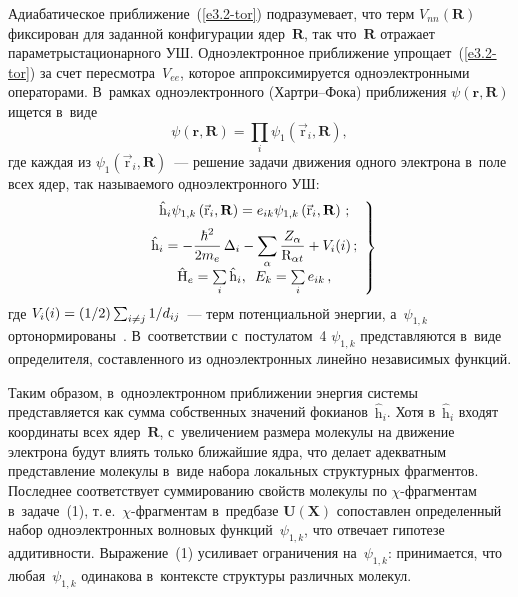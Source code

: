 \begin{multicols}{2}
Адиабатическое приближение~(\ref{e3.2-tor}) подразумевает, что терм 
$V_{nn}(\mathbf{R})$ фиксирован для заданной конфигурации 
ядер~$\mathbf{R}$, так что~$\mathbf{R}$ отражает параметры\linebreak стационарного 
УШ. Одноэлектронное приближение упрощает~(\ref{e3.2-tor}) за счет 
пересмотра~$V_{ee}$, которое аппроксимируется одноэлектронными 
операторами. В~рамках одноэлектронного (\mbox{Харт\-ри--Фо\-ка}) приближения 
$\psi(\mathbf{r},\mathbf{R})$ ищется в~виде 
$$
\psi(\mathbf{r},\mathbf{R})= \prod\limits_i \psi_1\left(\vec{\mathrm{r}}_i, \mathbf{R}\right),
$$
 где каждая из 
$\psi_1(\vec{\mathrm{r}}_i,\mathbf{R})$~--- решение задачи движения одного 
электрона в~поле всех ядер, так называемого одноэлектронного УШ:
\begin{equation}
\left.
\begin{array}{c}
\hat{\mathrm{h}}_i\psi_{1,k}\left(\vec{\mathrm{r}}_i,\mathbf{R}\right) = e_{ik} 
\psi_{1,k}\left( \vec{\mathrm{r}}_i,\mathbf{R}\right)\,;\\[6pt]
\hat{\mathrm{h}}_i= \displaystyle -\displaystyle\frac{\displaystyle \hbar^2\mathstrut}{\displaystyle 2m_e\mathstrut}\,\Delta_i -\sum\limits_\alpha 
\displaystyle\frac{\displaystyle Z_\alpha\mathstrut}{\displaystyle \mathrm{R}_{\alpha t}\mathstrut}+V_i(i)\,;\\[6pt]
\hat{\mathrm{H}}_e= \sum\limits_i \hat{\mathrm{h}}_i,\enskip 
{E}_k=\sum\limits_i e_{ik}\,,
\end{array}
\right\}
\label{e3.3-tor}
\end{equation}
где $V_i(i)\hm= (1/2)\sum\nolimits_{i\not= j} 1/d_{ij}$~--- терм потенциальной 
энергии, а~$\psi_{1,k}$ ортонормированы~\cite{2-tor}. В~соответствии 
с~постулатом~4 $\psi_{1,k}$ представляются в~виде определителя, 
составленного из одноэлектронных линейно независимых функций.
    
Таким образом, в~одноэлектронном приближении энергия системы 
представляется как сумма собственных значений 
фокианов~$\hat{\mathrm{h}}_i$. Хотя в~$\hat{\mathrm{h}}_i$ входят 
координаты всех ядер~$\mathbf{R}$, с~увеличением размера молекулы на 
движение электрона будут влиять только ближайшие ядра, что делает 
адекватным представление молекулы в~виде набора локальных структурных 
фрагментов. Последнее соответствует суммированию свойств молекулы по  
$\chi$-фраг\-мен\-там в~задаче~(1), т.\,е.\ $\chi$-фраг\-мен\-там в~предбазе 
$\mathbf{U}(\mathbf{X})$ сопоставлен определенный набор одноэлектронных 
волновых функций~$\psi_{1,k}$, что отвечает гипотезе аддитивности. 
Выражение~(1) усиливает ограничения на~$\psi_{1,k}$: принимается, что 
любая~$\psi_{1,k}$ одинакова в~контексте структуры различных молекул.


\end{multicols}
